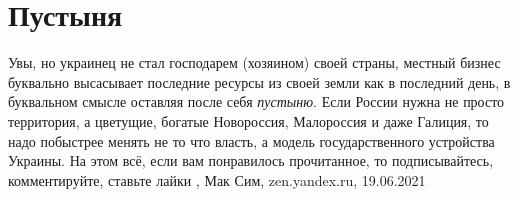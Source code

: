  
 
 
 
 
\chapter{Пустыня}
\label{sec:slova.pustynja}

Увы, но украинец не стал господарем (хозяином) своей страны, местный бизнес
буквально высасывает последние ресурсы из своей земли как в последний день, в
буквальном смысле оставляя после себя \emph{пустыню}.  Если России нужна не
просто территория, а цветущие, богатые Новороссия, Малороссия и даже Галиция,
то надо побыстрее менять не то что власть, а модель государственного устройства
Украины. На этом всё, если вам понравилось прочитанное, то подписывайтесь,
комментируйте, ставьте лайки
, 
Мак Сим, zen.yandex.ru, 19.06.2021
